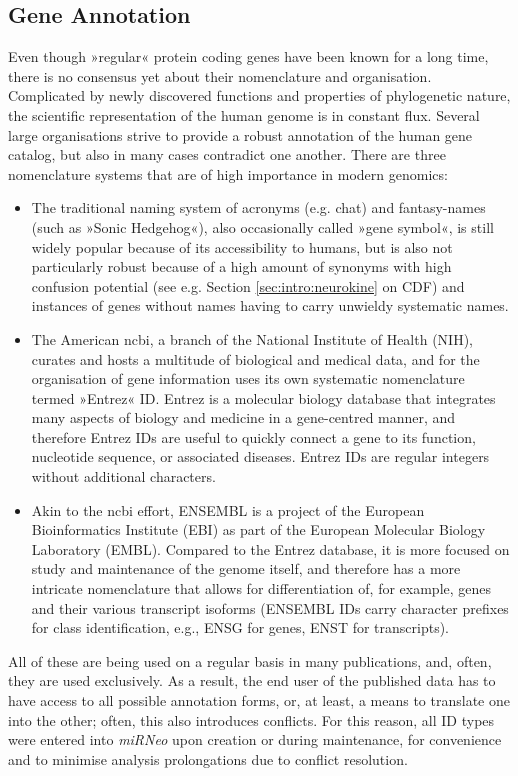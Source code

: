 \subsection{Gene Annotation}
Even though »regular« protein coding genes have been known for a long time, there is no consensus yet about their nomenclature and organisation. Complicated by newly discovered functions and properties of phylogenetic nature, the scientific representation of the human genome is in constant flux. Several large organisations strive to provide a robust annotation of the human gene catalog, but also in many cases contradict one another. There are three nomenclature systems that are of high importance in modern genomics: 
\begin{itemize}[noitemsep, leftmargin=.5cm, label={\tiny\raisebox{1ex}{\textbullet}}]
\item The traditional naming system of acronyms (e.g. \ac{chat}) and fantasy-names (such as »Sonic Hedgehog«), also occasionally called »gene symbol«, is still widely popular because of its accessibility to humans, but is also not particularly robust because of a high amount of synonyms with high confusion potential (see e.g. Section \ref{sec:intro:neurokine} on CDF) and instances of genes without names having to carry unwieldy systematic names.
\item The American \ac{ncbi}, a branch of the National Institute of Health (NIH), curates and hosts a multitude of biological and medical data, and for the organisation of gene information uses its own systematic nomenclature termed »Entrez« ID. Entrez is a molecular biology database that integrates many aspects of biology and medicine in a gene-centred manner, and therefore Entrez IDs are useful to quickly connect a gene to its function, nucleotide sequence, or associated diseases. Entrez IDs are regular integers without additional characters.
\item Akin to the \ac{ncbi} effort, ENSEMBL is a project of the European Bioinformatics Institute (EBI) as part of the European Molecular Biology Laboratory (EMBL). Compared to the Entrez database, it is more focused on study and maintenance of the genome itself, and therefore has a more intricate nomenclature that allows for differentiation of, for example, genes and their various transcript isoforms (ENSEMBL IDs carry character prefixes for class identification, e.g., ENSG for genes, ENST for transcripts).
\end{itemize}
All of these are being used on a regular basis in many publications, and, often, they are used exclusively. As a result, the end user of the published data has to have access to all possible annotation forms, or, at least, a means to translate one into the other; often, this also introduces conflicts. For this reason, all ID types were entered into \textit{miRNeo} upon creation or during maintenance, for convenience and to minimise analysis prolongations due to conflict resolution.

